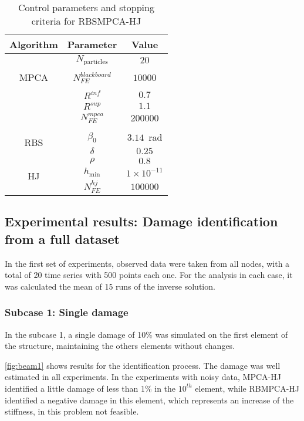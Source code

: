 \begin{table}[H]
\caption{Control parameters and stopping criteria for RBSMPCA-HJ}
\label{tab:param_beam}
\footnotesize
\centering
\begin{tabular}{ccc}
\hline
Algorithm & Parameter & Value \\
\hline
\multirow{5}{*}{MPCA} & $N_{\mathrm{particles}}$ & $20$ \\
\\[-0.7em]
& $N_{FE}^{blackboard}$ & $10000$ \\
\\[-0.7em]
 & $R^{inf}$ & $0.7$ \\
 & $R^{sup}$ & $1.1$ \\
 & $N_{FE}^{mpca}$ & $200000$ \\
 \\[-0.7em]
\hline
\multirow{2}{*}{RBS} & $\beta_0$ & $3.14$~rad \\
& $\delta$ & $0.25$ \\
\hline
\multirow{3}{*}{HJ} & $\rho $ & $0.8$ \\
 & $h_{\mathrm{min}}$ & $1 \times 10^{-11}$ \\
 & $N_{FE}^{hj}$ & $100000$ \\
\hline
\end{tabular}
\end{table}


\subsection{Experimental results: Damage identification from a full dataset}

In the first set of experiments, observed data were taken from all nodes, with a total of 20 time series with 500 points each one. For the analysis in each case, it was calculated the mean of 15 runs of the inverse solution.

\subsubsection{Subcase 1: Single damage}

In the subcase 1, a single damage of 10\% was simulated on the first element of the structure, maintaining the others elements without changes.

\autoref{fig:beam1} shows results for the identification process. The damage was well estimated in all experiments. In the experiments with noisy data, MPCA-HJ identified a little damage of less than 1\% in the $10^{th}$ element, while RBMPCA-HJ identified a negative damage in this element, which represents an increase of the stiffness, in this problem not feasible.

